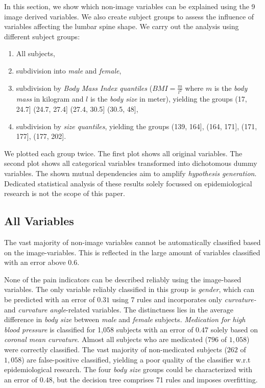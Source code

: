 \documentclass[a4paper,twoside]{style/article}
\begin{document}
\noindent In this section, we show which non-image variables can be explained using the 9 image derived variables.
We also create subject groups to assess the influence of variables affecting the lumbar spine shape.
We carry out the analysis using different subject groups:
\begin{enumerate}
	\item All subjects,
	\item subdivision into \emph{male} and \emph{female},
	\item subdivision by \emph{Body Mass Index quantiles} ($BMI = \frac{m}{l^2}$ where $m$ is the \emph{body mass} in kilogram and $l$ is the \emph{body size} in meter), yielding the groups (17, 24.7] (24.7, 27.4] (27.4, 30.5] (30.5, 48],
	\item subdivision by \emph{size quantiles}, yielding the groups (139, 164], (164, 171], (171, 177], (177, 202].
\end{enumerate}
We plotted each group twice.
The first plot shows all original variables.
The second plot shows all categorical variables transformed into dichotomous dummy variables. %
The shown mutual dependencies aim to amplify \emph{hypothesis generation}.
Dedicated statistical analysis of these results solely focussed on epidemiological research is not the scope of this paper.
\subsection{All Variables}
The vast majority of non-image variables cannot be automatically classified based on the image-variables.
This is reflected in the large amount of variables classified with an error above $0.6$.

None of the pain indicators can be described reliably using the image-based variables.
The only variable reliably classified in this group is \emph{gender}, which can be predicted with an error of $0.31$ using 7 rules and incorporates only \emph{curvature-} and \emph{curvature angle}-related variables.
%
The distinctness lies in the average difference in \emph{body size} between \emph{male} and \emph{female} subjects.
\emph{Medication for high blood pressure} is classified for 1,058 subjects with an error of $0.47$ solely based on \emph{coronal mean curvature}.
Almost all subjects who are medicated ($796$ of $1,058$) were correctly classified.
The vast majority of non-medicated subjects ($262$ of $1,058$) are false-positive classified, yielding a poor quality of the classifier w.r.t epidemiological research.
The four \emph{body size} groups could be characterized with an error of $0.48$, but the decision tree comprises 71 rules and imposes overfitting.
\end{document}
